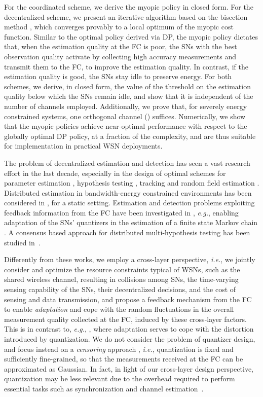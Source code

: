 \documentclass[10pt,twocolumn,twoside]{IEEEtran}
\theoremstyle{plain}
\begin{document}
For the coordinated scheme, we derive the myopic policy in closed form. For the decentralized scheme,
we present an iterative algorithm based on the bisection method \cite{bisection}, which converges provably to a local optimum of the myopic cost function.
Similar to the optimal policy derived via DP, the myopic policy dictates that, when the estimation quality at the FC is poor, the 
SNs with the best observation quality activate  by collecting high accuracy measurements and transmit them to the FC, to improve the estimation quality.
In contrast, if the estimation quality is good, the SNs stay idle to preserve energy. For both schemes, we derive, in closed form,  the value of the threshold on the estimation quality below which the SNs remain idle, and show that it is independent of the number of channels  employed. Additionally, we prove that, for severely energy constrained systems, one orthogonal channel () suffices. Numerically, we show that  the myopic policies achieve near-optimal performance with respect to the globally optimal DP policy, at a fraction of the complexity, and are thus suitable for implementation in practical WSN deployments.

The problem of decentralized estimation and detection has seen a vast research effort in the last decade,
especially in the design of optimal schemes 
for parameter estimation \cite{Xiao,Thatte,Xiao2}, hypothesis testing \cite{Ray,Tsitsiklis,Chamberland}, tracking \cite{Saber,Epstein} and random field estimation \cite{Fang}.
Distributed estimation in bandwidth-energy constrained environments has been considered in \cite{Chieh,Ribeiro,Msechu,Junlin}, for a static setting.
 Estimation and detection problems exploiting
feedback information from the FC have been investigated in \cite{Dogandzic,Peng,Kreidl,Dey},
\emph{e.g.}, enabling adaptation of the SNs' quantizers in the estimation of a finite state Markov chain \cite{Dey}.
A consensus based approach for distributed multi-hypothesis testing has been studied in~\cite{Saligrama}.

Differently from these works, we employ a cross-layer perspective, \emph{i.e.}, we jointly consider and optimize the resource constraints typical of WSNs,
such as the shared wireless channel, resulting in collisions among SNs, the time-varying sensing capability of the SNs, their decentralized decisions,
and the cost of sensing and data transmission, and propose a feedback mechanism from the FC to enable \emph{adaptation} and cope with the random fluctuations  in the overall measurement quality collected at the FC,
induced by these cross-layer factors.
This is in contrast to, \emph{e.g.}, \cite{Dey}, where adaptation serves to cope with the distortion introduced by quantization.
We do not consider the problem of quantizer design,
and focus instead on a  \emph{censoring} approach \cite{Appadwedula,Msechu},
 \emph{i.e.}, quantization is fixed and sufficiently fine-grained, so that the measurements received at the FC can be approximated as Gaussian.
In fact, in light of our cross-layer design perspective, quantization may be less relevant due to the overhead required to perform essential tasks such as
synchronization and channel estimation~\cite{Appadwedula}.
\end{document}
